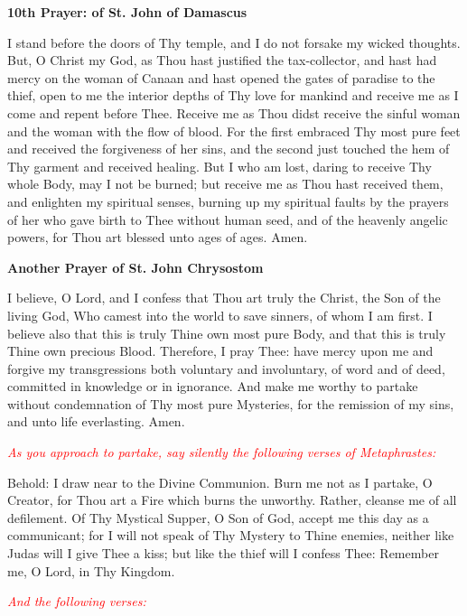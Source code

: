 \begin{center}
	\textbf{10th Prayer: of St. John of Damascus}
\end{center}

I stand before the doors of Thy temple, and I do not forsake my wicked thoughts. But, O Christ my God, as Thou hast justified the tax-collector, and hast had mercy on the woman of Canaan and hast opened the gates of paradise to the thief, open to me the interior depths of Thy love for mankind and receive me as I come and repent before Thee. Receive me as Thou didst receive the sinful woman and the woman with the flow of blood. For the first embraced Thy most pure feet and received the forgiveness of her sins, and the second just touched the hem of Thy garment and received healing. But I who am lost, daring to receive Thy whole Body, may I not be burned; but receive me as Thou hast received them, and enlighten my spiritual senses, burning up my spiritual faults by the prayers of her who gave birth to Thee without human seed, and of the heavenly angelic powers, for Thou art blessed unto ages of ages. Amen.

\begin{center}
	\textbf{Another Prayer of St. John Chrysostom}
\end{center}

I believe, O Lord, and I confess that Thou art truly the Christ, the Son of the living God, Who camest into the world to save sinners, of whom I am first. I believe also that this is truly Thine own most pure Body, and that this is truly Thine own precious Blood. Therefore, I pray Thee: have mercy upon me and forgive my transgressions both voluntary and involuntary, of word and of deed, committed in knowledge or in ignorance. And make me worthy to partake without condemnation of Thy most pure Mysteries, for the remission of my sins, and unto life everlasting. Amen. 

\textcolor{red}{\textit{As you approach to partake, say silently the following verses of Metaphrastes:}}

Behold: I draw near to the Divine Communion. Burn me not as I partake, O Creator, for Thou art a Fire which burns the unworthy. Rather, cleanse me of all defilement. Of Thy Mystical Supper, O Son of God, accept me this day as a communicant; for I will not speak of Thy Mystery to Thine enemies, neither like Judas will I give Thee a kiss; but like the thief will I confess Thee: Remember me, O Lord, in Thy Kingdom.

\textcolor{red}{\textit{And the following verses:}}

